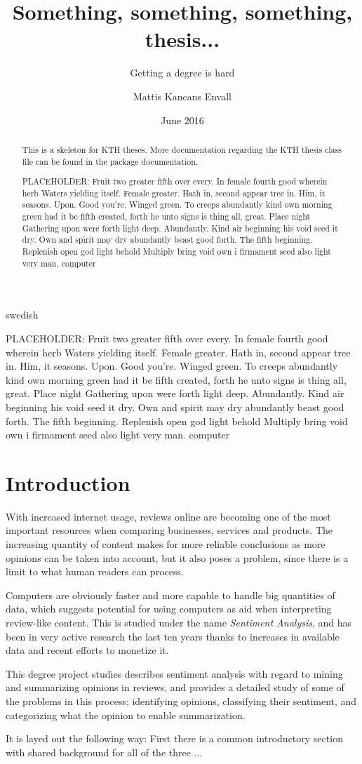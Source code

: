\documentclass[a4paper,11pt]{kth-mag}
\title{Something, something, something, thesis...}
\subtitle{Getting a degree is hard}
\author{Mattis Kancans Envall}
\date{June 2016}
\newcommand{\todo}{ ... }
\newcommand{\loremipsum}{
  {\color{lightgray}
  PLACEHOLDER: Fruit two greater fifth over every. In female fourth good wherein herb
  Waters yielding itself. Female greater. Hath in, second appear tree in.
  Him, it seasons. Upon. Good you're. Winged green. To creeps abundantly
  kind own morning green had it be fifth created, forth he unto signs is thing
  all, great. Place night Gathering upon were forth light deep. Abundantly.
  Kind air beginning his void seed it dry. Own and spirit may dry abundantly
  beast good forth. The fifth beginning. Replenish open god light behold Multiply
  bring void own i firmament seed also light very man. \gls{computer}

  }
}
\begin{document}
\frontmatter
\pagestyle{empty}
\removepagenumbers
\maketitle
{}
\begin{abstract}
  This is a skeleton for KTH theses. More documentation
  regarding the KTH thesis class file can be found in
  the package documentation.

\loremipsum

\end{abstract}
\clearpage
\begin{foreignabstract}{swedish}
\loremipsum

\end{foreignabstract}
\clearpage
\tableofcontents*

\glsaddall
\printglossaries

\mainmatter
\pagestyle{newchap}
\chapter{Introduction}
With increased internet usage, reviews online are becoming one of the most important resources when comparing businesses, services and products.
The increasing quantity of content makes for more reliable conclusions as more opinions can be taken into account, but it also poses a problem,
since there is a limit to what human readers can process.

Computers are obviously faster and more capable to handle big quantities of data, which suggests potential for using computers as aid when
interpreting review-like content. This is studied under the name \emph{Sentiment Analysis}, and has been in very active research the last ten years
thanks to increases in available data and recent efforts to monetize it.

This degree project studies describes sentiment analysis with regard to mining and summarizing opinions in reviews, and provides a detailed study of some of the problems in this process; identifying opinions, classifying their sentiment, and categorizing what the opinion to enable summarization.

It is layed out the following way: First there is a common introductory section with shared background for all of the three \todo


\end{document}
